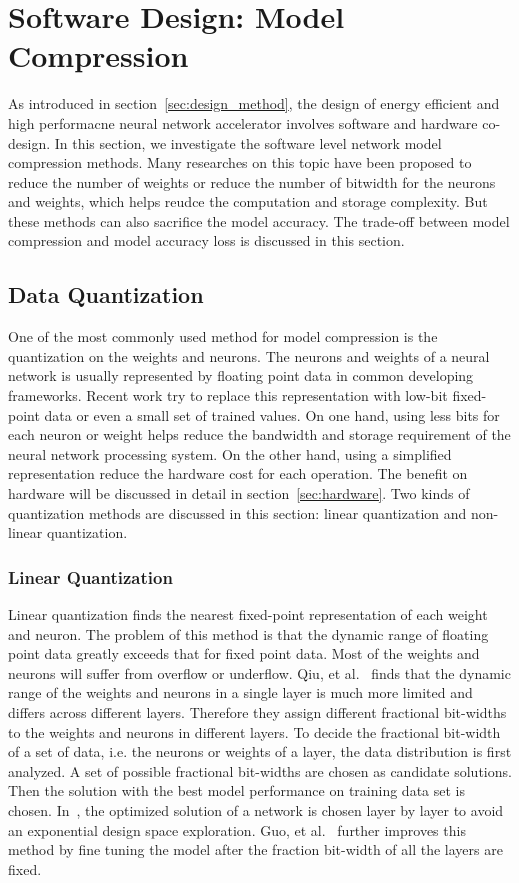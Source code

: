 \section{Software Design: Model Compression}\label{sec:software}

As introduced in section~\ref{sec:design_method}, the design of energy efficient and high performacne neural network accelerator involves software and hardware co-design. In this section, we investigate the software level network model compression methods. Many researches on this topic have been proposed to reduce the number of weights or reduce the number of bitwidth for the neurons and weights, which helps reudce the computation and storage complexity. But these methods can also sacrifice the model accuracy. The trade-off between model compression and model accuracy loss is discussed in this section.

\subsection{Data Quantization}\label{sec:software:quant}
One of the most commonly used method for model compression is the quantization on the weights and neurons. The neurons and weights of a neural network is usually represented by floating point data in common developing frameworks. Recent work try to replace this representation with low-bit fixed-point data or even a small set of trained values. On one hand, using less bits for each neuron or weight helps reduce the bandwidth and storage requirement of the neural network processing system. On the other hand, using a simplified representation reduce the hardware cost for each operation. The benefit on hardware will be discussed in detail in section~\ref{sec:hardware}. Two kinds of quantization methods are discussed in this section: linear quantization and non-linear quantization.

\subsubsection{Linear Quantization}
Linear quantization finds the nearest fixed-point representation of each weight and neuron. The problem of this method is that the dynamic range of floating point data greatly exceeds that for fixed point data. Most of the weights and neurons will suffer from overflow or underflow. Qiu, et al.~\cite{qiu2016going} finds that the dynamic range of the weights and neurons in a single layer is much more limited and differs across different layers. Therefore they assign different fractional bit-widths to the weights and neurons in different layers. To decide the fractional bit-width of a set of data, i.e. the neurons or weights of a layer, the data distribution is first analyzed. A set of possible fractional bit-widths are chosen as candidate solutions. Then the solution with the best model performance on training data set is chosen. In~\cite{qiu2016going}, the optimized solution of a network is chosen layer by layer to avoid an exponential design space exploration. Guo, et al.~\cite{guo2017angel} further improves this method by fine tuning the model after the fraction bit-width of all the layers are fixed.

